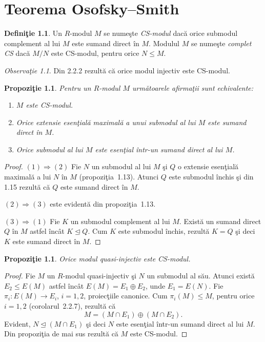 \documentclass[12pt,a4paper]{book}
\newcommand{\ess}{\trianglelefteq}  %
\theoremstyle{plain}
\newtheorem{proposition}[theorem]{Propoziţie}
\theoremstyle{definition}
\newtheorem{definition}[theorem]{Definiţie}
\theoremstyle{remark}
\newtheorem{remark}[theorem]{Observaţie}
\begin{document}

\chapter{Teorema Osofsky–Smith}

\begin{definition}
Un \(R\)-modul \(M\) se numeşte \emph{CS-modul} dacă orice submodul complement al lui \(M\) este sumand direct în \(M\).
Modulul \(M\) se numeşte \emph{complet CS} dacă \(M/N\) este CS-modul, pentru orice \(N \leq M\).
\end{definition}

\begin{remark}
Din 2.2.2 rezultă că orice modul injectiv este CS-modul.
\end{remark}

\begin{proposition}
Pentru un \(R\)-modul \(M\) următoarele afirmaţii sunt echivalente:
\begin{enumerate}
  \item \(M\) este CS-modul.
  \item Orice extensie esenţială maximală a unui submodul al lui \(M\) este sumand direct în \(M\).
  \item Orice submodul al lui \(M\) este esenţial într-un sumand direct al lui \(M\).
\end{enumerate}
\end{proposition}

\begin{proof}
\((1) \Rightarrow (2)\) Fie \(N\) un submodul al lui \(M\) şi \(Q\) o extensie esenţială maximală a lui \(N\) în \(M\) (propoziţia~1.13).
Atunci \(Q\) este submodul închis şi din 1.15 rezultă că \(Q\) este sumand direct în \(M\).

\((2) \Rightarrow (3)\) este evidentă din propoziţia~1.13.

\((3) \Rightarrow (1)\) Fie \(K\) un submodul complement al lui \(M\).
Există un sumand direct \(Q\) în \(M\) astfel încât \(K \ess Q \).
Cum \(K\) este submodul închis, rezultă \(K = Q\) şi deci \(K\) este sumand direct în \(M\).
\end{proof}

\begin{proposition}
Orice modul quasi-injectiv este CS-modul.
\end{proposition}

\begin{proof}
Fie \(M\) un \(R\)-modul quasi-injectiv şi \(N\) un submodul al său.
Atunci există \(E_2 \leq E(M)\) astfel încât \(E(M) = E_1 \oplus E_2\), unde \(E_1 = E(N)\).
Fie \(\pi_i : E(M) \to E_i\), \(i = 1,2\), proiecţiile canonice.
Cum \(\pi_i(M) \leq M\), pentru orice \(i = 1,2\) (corolarul~2.2.7), rezultă că
\[
M = (M \cap E_1) \oplus (M \cap E_2).
\]
Evident, \(N \ess (M \cap E_1) \) şi deci \(N\) este esenţial într-un sumand direct al lui \(M\).
Din propoziţia de mai sus rezultă că \(M\) este CS-modul.
\end{proof}
\end{document}
